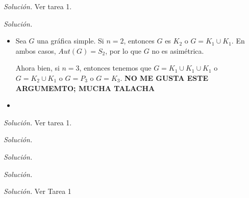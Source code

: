 \documentclass[12pt]{article}
\newenvironment{problem}[2][Problema]{\begin{trivlist}
\item[\hskip \labelsep {\bfseries #1}\hskip \labelsep {\bfseries #2}]}{\end{trivlist}}
\begin{document}
\begin{problem}{1.2.13}

\end{problem}
\textit{Solución.} Ver tarea 1.

\begin{problem}{1.2.14}

\end{problem}
\textit{Solución.} \begin{itemize}
    \item[a)] Sea $G$ una gráfica simple. Si $n = 2$, entonces $G$ es $K_2$ o $G = K_1 \cup K_1$. En ambos casos, $Aut(G) = S_2$, por lo que $G$ no es asimétrica.
    
    Ahora bien, si $n = 3$, entonces tenemos que $G = K_1 \cup K_1 \cup K_1$ o  $G = K_2 \cup K_1$ o $G = P_3$ o $G = K_3.$
    \textbf{NO ME GUSTA ESTE ARGUMEMTO; MUCHA TALACHA}
    
    \item[b)]
\end{itemize}

\begin{problem}{1.2.17}

\end{problem}
\textit{Solución.} Ver tarea 1.

\begin{problem}{1.3.2}

\end{problem}
\textit{Solución.}

\begin{problem}{1.3.4}

\end{problem}
\textit{Solución.}

\begin{problem}{1.3.7}

\end{problem}
\textit{Solución.}



\begin{problem}{1.3.8}

\end{problem}
\textit{Solución.} Ver Tarea 1
\end{document}
